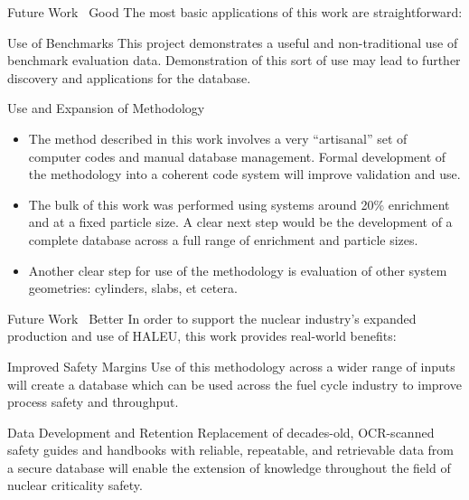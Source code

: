\documentclass[10pt,aspectratio=169]{beamer}              %
\begin{document}
\begin{frame}{Future Work \textendash\ Good}
     The most basic applications of this work are straightforward:
    \begin{block}{Use of Benchmarks}
        This project demonstrates a useful and non-traditional use of benchmark evaluation data. Demonstration of this sort of use may lead to further discovery and applications for the database.
     \end{block}
     \begin{block}{Use and Expansion of Methodology}
        \begin{itemize}
            \item The method described in this work involves a very ``artisanal'' set of computer codes and manual database management. Formal development of the methodology into a coherent code system will improve validation and use.
            \item The bulk of this work was performed using systems around 20\% enrichment and at a fixed particle size. A clear next step would be the development of a complete database across a full range of enrichment and particle sizes.
            \item Another clear step for use of the methodology is evaluation of other system geometries: cylinders, slabs, et cetera.
        \end{itemize}
     \end{block}
\end{frame}

\begin{frame}{Future Work \textendash\ Better}
In order to support the nuclear industry's expanded production and use of HALEU, this work provides real-world benefits:

    \begin{block}{Improved Safety Margins}
        Use of this methodology across a wider range of inputs will create a database which can be used across the fuel cycle industry to improve process safety and throughput.
    \end{block}
    \begin{block}{Data Development and Retention}
        Replacement of decades-old, OCR-scanned safety guides and handbooks with reliable, repeatable, and retrievable data from a secure database will enable the extension of knowledge throughout the field of nuclear criticality safety.
    \end{block}
\end{frame}
\end{document}
